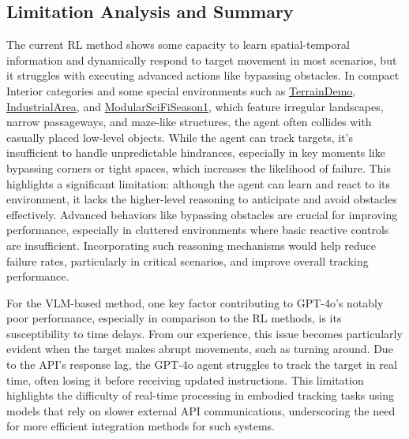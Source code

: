 \documentclass{article}
\begin{document}
\subsection{Limitation Analysis and Summary}
\vspace{-0.1cm}
The current RL method shows some capacity to learn spatial-temporal information and dynamically respond to target movement in most scenarios, but it struggles with executing advanced actions like bypassing obstacles. In compact Interior categories and some special environments such as \underline{TerrainDemo}, \underline{IndustrialArea}, and \underline{ModularSciFiSeason1}, which feature irregular landscapes, narrow passageways, and maze-like structures, the agent often collides with casually placed low-level objects. While the agent can track targets, it's insufficient to handle unpredictable hindrances, especially in key moments like bypassing corners or tight spaces, which increases the likelihood of failure. This highlights a significant limitation: although the agent can learn and react to its environment, it lacks the higher-level reasoning to anticipate and avoid obstacles effectively. Advanced behaviors like bypassing obstacles are crucial for improving performance, especially in cluttered environments where basic reactive controls are insufficient. Incorporating such reasoning mechanisms would help reduce failure rates, particularly in critical scenarios, and improve overall tracking performance.

For the VLM-based method, one key factor contributing to GPT-4o's notably poor performance, especially in comparison to the RL methods, is its susceptibility to time delays. From our experience, this issue becomes particularly evident when the target makes abrupt movements, such as turning around. Due to the API's response lag, the GPT-4o agent struggles to track the target in real time, often losing it before receiving updated instructions. This limitation highlights the difficulty of real-time processing in embodied tracking tasks using models that rely on slower external API communications, underscoring the need for more efficient integration methods for such systems.

\vspace{-0.3cm}
\end{document}
